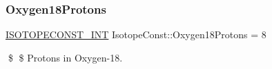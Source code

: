\subsubsection{\texorpdfstring{Oxygen18\+Protons}{Oxygen18Protons}}
{\footnotesize\ttfamily \mbox{\hyperlink{group___isotope_const-_macros_ga5f18360b3e99483a35c32d789e62621c}{I\+S\+O\+T\+O\+P\+E\+C\+O\+N\+S\+T\+\_\+\+I\+NT}} Isotope\+Const\+::\+Oxygen18\+Protons = 8}

\$ \$ Protons in Oxygen-\/18. 